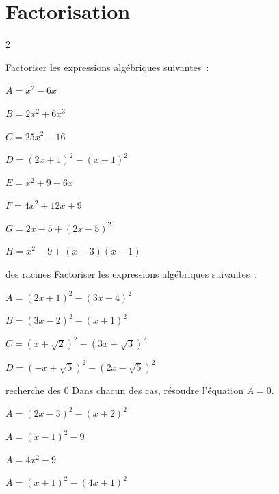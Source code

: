 \section{Factorisation}

\begin{multicols}{2}
\begin{exercice}{}{}
    Factoriser les expressions algébriques suivantes~:
    \begin{enumeratebf}
    \item $A = x^2 - 6x$
    \item $B = 2x^2 + 6x^3$
    \item $C = 25x^2 - 16$
    \item $D = (2x + 1)^2 - (x - 1)^2$
    \item $E = x^2 + 9 + 6x$
    \item $F = 4x^2 + 12x + 9$
    \item $G = 2x - 5 + (2x - 5)^2$
    \item $H = x^2 - 9 + (x - 3)(x + 1)$
\end{enumeratebf}
\end{exercice}


\begin{exercice}{}{des racines}
    Factoriser les expressions algébriques suivantes~:
    \begin{enumeratebf}
    \item $A = (2x + 1)^2 - (3x - 4)^2$
    \item $B = (3x - 2)^2 - (x + 1)^2$
    \item $C = (x + \sqrt{2})^2 - (3x + \sqrt{3})^2$
    \item $D = (-x + \sqrt{5})^2 - (2x - \sqrt{5})^2$
    \end{enumeratebf}
\end{exercice}
\newcolumn

\begin{exercice}{}{recherche des 0}
    Dans chacun des cas, résoudre l’équation $A = 0$.

\begin{enumeratebf}
    \item $A = (2x - 3)^2 - (x + 2)^2$
    \item $A = (x - 1)^2 - 9$
    \item $A = 4x^2 - 9$
    \item $A = (x + 1)^2 - (4x + 1)^2$
\end{enumeratebf}

\end{exercice}


\end{multicols}
